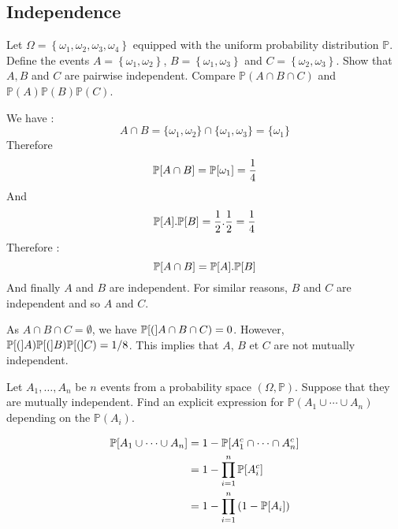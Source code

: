 \begin{center}
  \section*{Independence}
\end{center}

\begin{Exercise}[origin=Independent events]
  Let $\Omega=\left\{\omega_{1}, \omega_{2}, \omega_{3}, \omega_{4}\right\}$ equipped with the uniform probability distribution $\mathbb{P}$. Define the events $A=\left\{\omega_{1}, \omega_{2}\right\}$, $B=\left\{\omega_{1}, \omega_{3}\right\}$ and $C=\left\{\omega_{2}, \omega_{3}\right\}$.
  Show that $A, B$ and $C$ are pairwise independent. Compare $\mathbb{P}(A \cap B \cap C)$ and $\mathbb{P}(A) \mathbb{P}(B) \mathbb{P}(C)$.
\end{Exercise}

\vspace{0.5cm}

\begin{solution}
  We have :
  $$ A \cap B = \{\omega_1, \omega_2\} \cap \{\omega_1, \omega_3\} =  \{\omega_1\}  $$
  Therefore
  $$ \mathbb{P}[A \cap B] = \mathbb{P}[\omega_1] = \frac{1}{4}$$
  And
  $$ \mathbb{P}[A]. \mathbb{P}[B] = \frac{1}{2} . \frac{1}{2} = \frac{1}{4} $$
  Therefore :
  $$\mathbb{P}[A \cap B] = \mathbb{P}[A].\mathbb{P}[B]$$
  And finally $A$ and $B$ are independent. For similar reasons, $B$ and $C$ are independent and so $A$ and $C$.

  As $A \cap B \cap C=\emptyset$, we have  $\mathbb{P}[(]A \cap B \cap C) =0$. However, $\mathbb{P}[(]A) \mathbb{P}[(]B) \mathbb{P}[(]C)=1/8$. This implies that $A$, $B$ et $C$ are not mutually independent.
\end{solution}

\begin{Exercise}
  Let $A_1, \ldots , A_n$ be $n$ events from a probability space $(\Omega, \mathbb{P})$.
  Suppose that they are mutually independent. Find an explicit expression for $\mathbb{P}(A_1 \cup \cdots \cup A_n)$ depending on the $\mathbb{P}(A_i)$.
\end{Exercise}

\begin{solution}
  \begin{align*}
    \mathbb{P}[A_1 \cup \cdots \cup A_n] & = 1- \mathbb{P}[A_1^c \cap \cdots \cap A_n^c]             \\
                                     & = 1- \prod_{i = 1}^{n} \mathbb{P}[A_i^c]                  \\
                                     & = 1- \prod_{i = 1}^{n} \left( 1 - \mathbb{P}[A_i] \right)
  \end{align*}
\end{solution}

